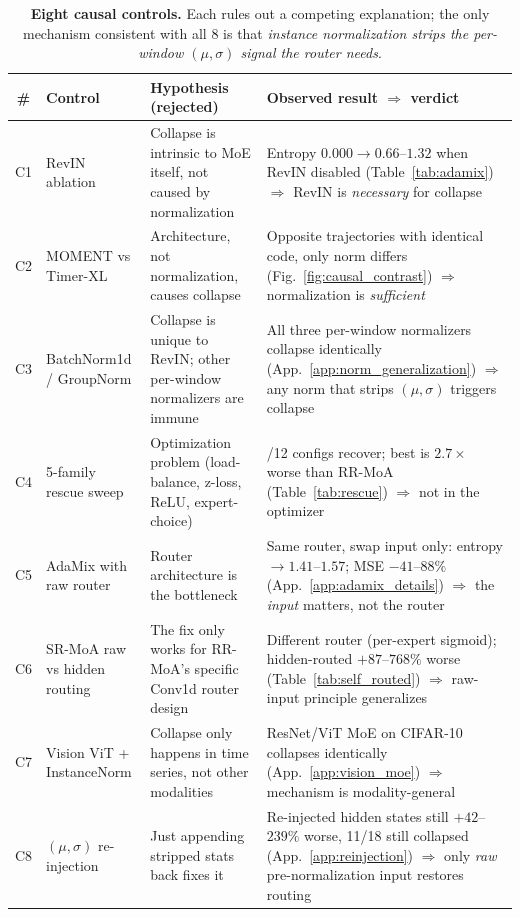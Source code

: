 \documentclass{article}
\begin{document}
\begin{table}[!htbp]
\centering
\caption{\textbf{Eight causal controls.} Each rules out a competing explanation; the only mechanism consistent with all 8 is that \emph{instance normalization strips the per-window $(\mu,\sigma)$ signal the router needs}.}
\label{tab:causal_controls}
\footnotesize
\setlength{\tabcolsep}{4pt}
\renewcommand{\arraystretch}{0.88}
\begin{tabular}{@{}cl >{\raggedright\arraybackslash}p{3.3cm} >{\raggedright\arraybackslash}p{5.95cm}@{}}
\toprule
\# & \textbf{Control} & \textbf{Hypothesis (rejected)} & \textbf{Observed result} $\Rightarrow$ \textbf{verdict} \\
\midrule
C1 & RevIN ablation & Collapse is intrinsic to MoE itself, not caused by normalization & Entropy $0.000 \to 0.66$--$1.32$ when RevIN disabled (Table~\ref{tab:adamix}) {\small$\Rightarrow$} RevIN is \emph{necessary} for collapse \\
C2 & MOMENT vs Timer-XL & Architecture, not normalization, causes collapse & Opposite trajectories with identical code, only norm differs (Fig.~\ref{fig:causal_contrast}) {\small$\Rightarrow$} normalization is \emph{sufficient} \\
C3 & BatchNorm1d / GroupNorm & Collapse is unique to RevIN; other per-window normalizers are immune & All three per-window normalizers collapse identically (App.~\ref{app:norm_generalization}) {\small$\Rightarrow$} any norm that strips $(\mu,\sigma)$ triggers collapse \\
C4 & 5-family rescue sweep & Optimization problem (load-balance, z-loss, ReLU, expert-choice) & 0/12 configs recover; best is $2.7{\times}$ worse than RR-MoA (Table~\ref{tab:rescue}) {\small$\Rightarrow$} not in the optimizer \\
C5 & AdaMix with raw router & Router architecture is the bottleneck & Same router, swap input only: entropy $\to 1.41$--$1.57$; MSE $-41$--$88\%$ (App.~\ref{app:adamix_details}) {\small$\Rightarrow$} the \emph{input} matters, not the router \\
C6 & SR-MoA raw vs hidden routing & The fix only works for RR-MoA's specific Conv1d router design & Different router (per-expert sigmoid); hidden-routed $+87$--$768\%$ worse (Table~\ref{tab:self_routed}) {\small$\Rightarrow$} raw-input principle generalizes \\
C7 & Vision ViT + InstanceNorm & Collapse only happens in time series, not other modalities & ResNet/ViT MoE on CIFAR-10 collapses identically (App.~\ref{app:vision_moe}) {\small$\Rightarrow$} mechanism is modality-general \\
C8 & $(\mu,\sigma)$ re-injection & Just appending stripped stats back fixes it & Re-injected hidden states still $+42$--$239\%$ worse, 11/18 still collapsed (App.~\ref{app:reinjection}) {\small$\Rightarrow$} only \emph{raw} pre-normalization input restores routing \\
\bottomrule
\end{tabular}
\end{table}
\end{document}
